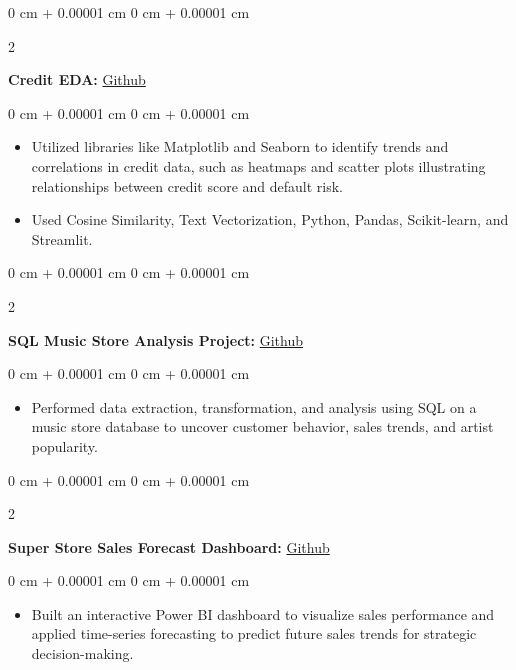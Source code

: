 \documentclass[10pt, letterpaper]{article}
\newenvironment{highlights}{
    \begin{itemize}[
        topsep=0.10 cm,
        parsep=0.10 cm,
        partopsep=0pt,
        itemsep=0pt,
        leftmargin=0 cm + 10pt
    ]
}{
    \end{itemize}
} %
\newenvironment{onecolentry}{
    \begin{adjustwidth}{
        0 cm + 0.00001 cm
    }{
        0 cm + 0.00001 cm
    }
}{
    \end{adjustwidth}
} %
\newenvironment{twocolentry}[2][]{
    \onecolentry
    \def\secondColumn{#2}
    \setcolumnwidth{\fill, 4.5 cm}
    \begin{paracol}{2}
}{
    \switchcolumn \raggedleft \secondColumn
    \end{paracol}
    \endonecolentry
} %
\begin{document}
        \begin{twocolentry}{
            \href{https://github.com/Ishan10123/Credit-EDA-Project-1Stop.ai-}{Github}
        }
            \textbf{Credit EDA:}\end{twocolentry}

        \vspace{0.10 cm}
        \begin{onecolentry}
            \begin{highlights}
                \item Utilized libraries like Matplotlib and Seaborn to identify trends and correlations in credit data, such as
heatmaps and scatter plots illustrating relationships between credit score and default risk.
                \item Used Cosine Similarity, Text Vectorization, Python, Pandas, Scikit-learn, and Streamlit.
            \end{highlights}
        \end{onecolentry}


            \vspace{2 pt}

        \begin{twocolentry}{
            \href{https://github.com/Ishan10123/SQL_Music_Store _Analysis_Project}{Github}
        }
            \textbf{SQL Music Store Analysis Project:}\end{twocolentry}

        \vspace{0.10 cm}
        \begin{onecolentry}
            \begin{highlights}
                \item Performed data extraction, transformation, and analysis using SQL on a music store database to uncover customer behavior, sales trends, and artist popularity.
            \end{highlights}
        \end{onecolentry}

               \vspace{2 pt}

        \begin{twocolentry}{
            \href{https://github.com/Ishan10123/Super_Store_Sale s_Forecast_Dashboard}{Github}
        }
            \textbf{Super Store Sales Forecast Dashboard:}\end{twocolentry}

        \vspace{0.10 cm}
        \begin{onecolentry}
            \begin{highlights}
                \item Built an interactive Power BI dashboard to visualize sales performance and applied time-series forecasting to predict future sales trends for strategic decision-making.
            \end{highlights}
        \end{onecolentry}
\end{document}
